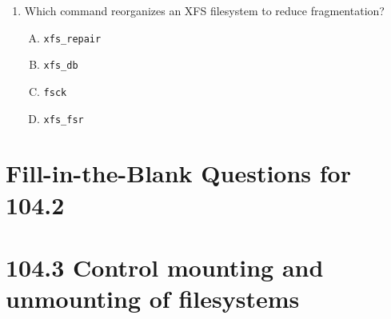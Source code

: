 \documentclass[a4paper]{report}
\begin{document}
\begin{enumerate}[1.]
    \item Which command reorganizes an XFS filesystem to reduce fragmentation?  
    \begin{enumerate}[A)]
        \item \texttt{xfs\_repair}  
        \item \texttt{xfs\_db}  
        \item \texttt{fsck}  
        \item \texttt{xfs\_fsr}  
    \end{enumerate}

\end{enumerate}

\newpage
\section*{Fill-in-the-Blank Questions for 104.2}

\newpage
\section*{104.3 Control mounting and unmounting of filesystems}

\newpage
\end{document}
